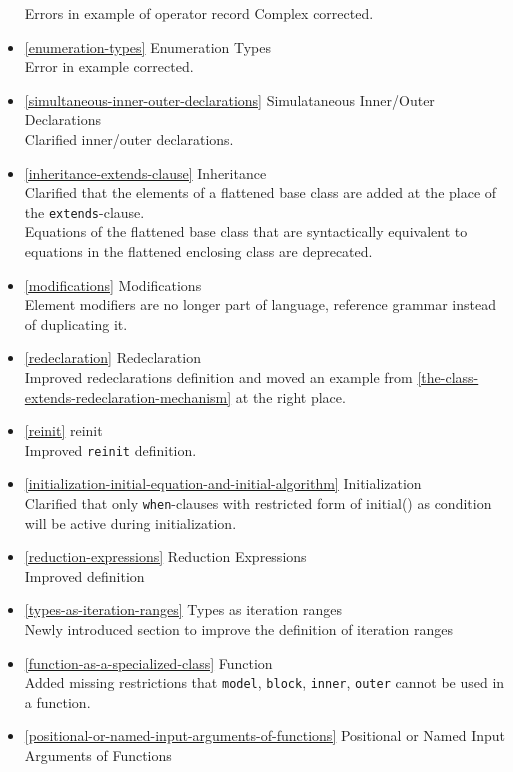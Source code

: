 \begin{itemize}
  Errors in example of operator record Complex corrected.
\item
  \cref{enumeration-types} Enumeration Types\\
  Error in example corrected.
\item
  \cref{simultaneous-inner-outer-declarations} Simulataneous Inner/Outer Declarations\\
  Clarified inner/outer declarations.
\item
  \cref{inheritance-extends-clause} Inheritance\\
  Clarified that the elements of a flattened base class are added at the place of the \lstinline!extends!-clause.\\
  Equations of the flattened base class that are syntactically equivalent to equations in the flattened enclosing class are deprecated.
\item
  \cref{modifications} Modifications\\
  Element modifiers are no longer part of language, reference grammar
  instead of duplicating it.
\item
  \cref{redeclaration} Redeclaration\\
  Improved redeclarations definition and moved an example from \cref{the-class-extends-redeclaration-mechanism} at
  the right place.
\item
  \cref{reinit} reinit\\
  Improved \lstinline!reinit! definition.
\item
  \cref{initialization-initial-equation-and-initial-algorithm} Initialization\\
  Clarified that only \lstinline!when!-clauses with restricted form of initial() as
  condition will be active during initialization.
\item
  \cref{reduction-expressions} Reduction Expressions\\
  Improved definition
\item
  \cref{types-as-iteration-ranges} Types as iteration ranges\\
  Newly introduced section to improve the definition of iteration ranges
\item
  \cref{function-as-a-specialized-class} Function\\
  Added missing restrictions that \lstinline!model!, \lstinline!block!, \lstinline!inner!, \lstinline!outer! cannot be used in a function.
\item
  \cref{positional-or-named-input-arguments-of-functions} Positional or Named Input Arguments of Functions\\

\end{itemize}
